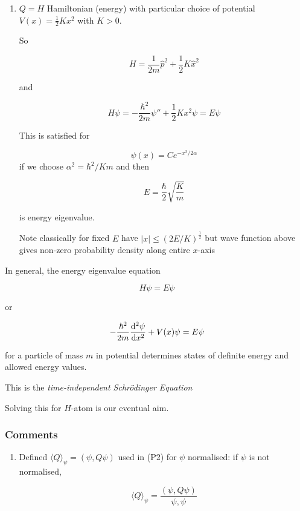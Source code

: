 \documentclass[a4paper]{article}
\begin{document}
\begin{eg}
\begin{eg}
\begin{enumerate}
		\item $ Q = H $ Hamiltonian (energy) with particular choice of potential $ V(x) = \frac{1}{2} K x^{2} $ with $ K > 0 $.
		
		So
		
		\[ H = \frac{1}{2m} \hat{p}^{2} + \frac{1}{2} K  \hat{x}^{2} \]
		
		and
		
		\[ H \psi = - \frac{\hbar^{2}}{2m} \psi''  + \frac{1}{2} K x^{2} \psi = E \psi  \]
		
		This is satisfied for 
		
		\[ \psi(x) = C e^{-x^{2}/2 \alpha} \] if we choose $ \alpha^{2} = \hbar^{2} / K m $ and then
		
		\[ E = \frac{\hbar}{2} \sqrt{\frac{K}{m}} \]
		
		is energy eigenvalue.
		
		Note classically for fixed $ E $ have $ | x | \leq ( 2E / K)^{\frac{1}{2}} $ but wave function above gives non-zero probability density along entire $ x $-axis
		
			\end{enumerate}
		
		\end{eg}
		
		In general, the energy eigenvalue equation 
		
		\[ H \psi = E \psi \]
		
		or
		
		\[ - \frac{\hbar^{2}}{2m} \frac{\mathrm{d}^{2} \psi }{\mathrm{d} x^{2} } + V(x) \psi = E \psi \]
		
		for a particle of mass $ m $ in potential determines states of definite energy and allowed energy values.
		
		This is the \emph{time-independent Schr\"odinger Equation}
		
		Solving this for $ H $-atom is our eventual aim.
		


\subsubsection{Comments}

\begin{enumerate}
	\item Defined $ \langle Q \rangle_{\psi} = (\psi, Q\psi) $ used in (P2) for $ \psi $ normalised: if $ \psi $ is not normalised, 
	
	\[ \langle Q \rangle_{\psi} = \frac{(\psi, Q \psi)}{\psi,\psi}  \]
	

\end{enumerate}
\end{eg}
\end{document}

